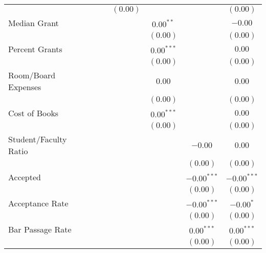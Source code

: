 \begin{table}
\begin{center}
\begin{tabular}{l c c c c c c }
                      &              &               & $(0.00)$      &               &               & $(0.00)$      \\
Median Grant          &              &               &               & $0.00^{**}$   &               & $-0.00$       \\
                      &              &               &               & $(0.00)$      &               & $(0.00)$      \\
Percent Grants        &              &               &               & $0.00^{***}$  &               & $0.00$        \\
                      &              &               &               & $(0.00)$      &               & $(0.00)$      \\
Room/Board Expenses   &              &               &               & $0.00$        &               & $0.00$        \\
                      &              &               &               & $(0.00)$      &               & $(0.00)$      \\
Cost of Books         &              &               &               & $0.00^{***}$  &               & $0.00$        \\
                      &              &               &               & $(0.00)$      &               & $(0.00)$      \\
Student/Faculty Ratio &              &               &               &               & $-0.00$       & $0.00$        \\
                      &              &               &               &               & $(0.00)$      & $(0.00)$      \\
Accepted              &              &               &               &               & $-0.00^{***}$ & $-0.00^{***}$ \\
                      &              &               &               &               & $(0.00)$      & $(0.00)$      \\
Acceptance Rate       &              &               &               &               & $-0.00^{***}$ & $-0.00^{*}$   \\
                      &              &               &               &               & $(0.00)$      & $(0.00)$      \\
Bar Passage Rate      &              &               &               &               & $0.00^{***}$  & $0.00^{***}$  \\
                      &              &               &               &               & $(0.00)$      & $(0.00)$      \\

\end{tabular}
\end{center}
\end{table}
